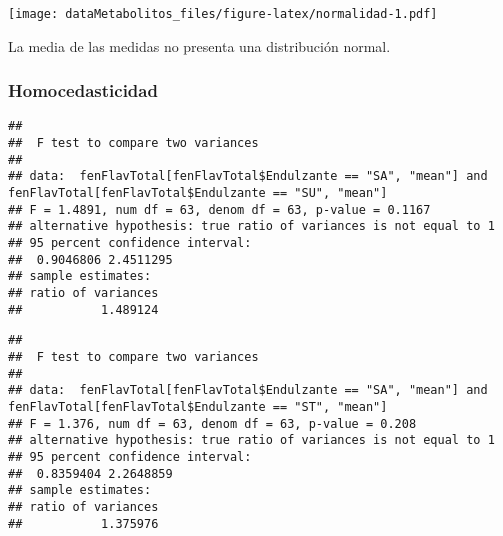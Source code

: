 \documentclass[
]{article}
\newenvironment{Shaded}{\begin{snugshade}}{\end{snugshade}}
\newcommand{\AttributeTok}[1]{\textcolor[rgb]{0.77,0.63,0.00}{#1}}
\newcommand{\FunctionTok}[1]{\textcolor[rgb]{0.00,0.00,0.00}{#1}}
\newcommand{\NormalTok}[1]{#1}
\newcommand{\SpecialCharTok}[1]{\textcolor[rgb]{0.00,0.00,0.00}{#1}}
\newcommand{\StringTok}[1]{\textcolor[rgb]{0.31,0.60,0.02}{#1}}
\begin{document}
\texttt{[image: dataMetabolitos\_files/figure-latex/normalidad-1.pdf]}

La media de las medidas no presenta una distribución normal.

\hypertarget{homocedasticidad}{%
\subsubsection{Homocedasticidad}\label{homocedasticidad}}

\begin{Shaded}
\end{Shaded}

\begin{verbatim}
## 
##  F test to compare two variances
## 
## data:  fenFlavTotal[fenFlavTotal$Endulzante == "SA", "mean"] and fenFlavTotal[fenFlavTotal$Endulzante == "SU", "mean"]
## F = 1.4891, num df = 63, denom df = 63, p-value = 0.1167
## alternative hypothesis: true ratio of variances is not equal to 1
## 95 percent confidence interval:
##  0.9046806 2.4511295
## sample estimates:
## ratio of variances 
##           1.489124
\end{verbatim}

\begin{Shaded}
\end{Shaded}

\begin{verbatim}
## 
##  F test to compare two variances
## 
## data:  fenFlavTotal[fenFlavTotal$Endulzante == "SA", "mean"] and fenFlavTotal[fenFlavTotal$Endulzante == "ST", "mean"]
## F = 1.376, num df = 63, denom df = 63, p-value = 0.208
## alternative hypothesis: true ratio of variances is not equal to 1
## 95 percent confidence interval:
##  0.8359404 2.2648859
## sample estimates:
## ratio of variances 
##           1.375976
\end{verbatim}
\end{document}
